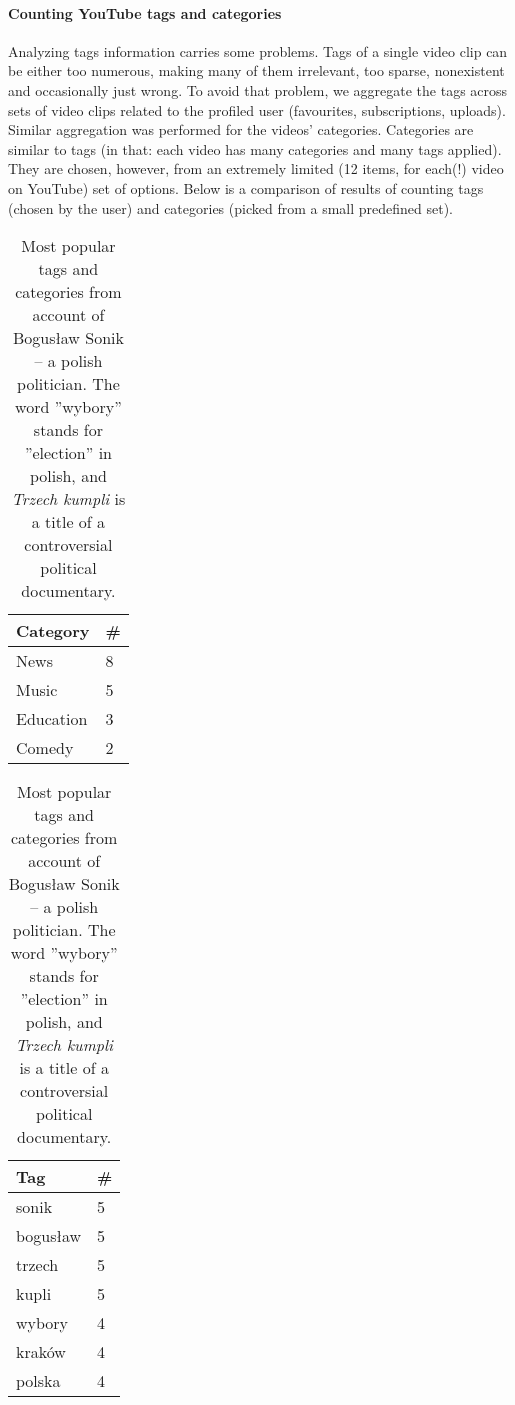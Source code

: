 \paragraph{Counting YouTube tags and categories}
Analyzing tags information carries some problems. Tags of a single video clip
can be either too numerous, making many
of them irrelevant, too sparse, nonexistent and occasionally just wrong. To avoid
that problem, we aggregate the tags across sets of video clips related to the
profiled user (favourites, subscriptions, uploads). Similar aggregation was
performed for the videos' categories. Categories are similar to tags (in that:
each video has many categories and many tags applied). They are chosen,
however, from an extremely limited (12 items, for each(!) video on YouTube) set
of options.  Below is a comparison of results of counting
tags (chosen by the user) and categories (picked from a small predefined set).


\begin{table}[ht]
\begin{minipage}[b]{0.5\linewidth}\centering

\begin{tabular}{| l | l |}
Category & \# \\ \hline
News & 8 \\
Music & 5 \\
Education & 3 \\
Comedy & 2 \\
\end{tabular}

\end{minipage}
\hspace{0.5cm}
\begin{minipage}[b]{0.5\linewidth}
\centering

\begin{tabular}{| l | l |}
Tag & \# \\ \hline
sonik & 5 \\
bogusław & 5 \\
trzech & 5 \\
kupli & 5 \\
wybory & 4 \\
kraków & 4 \\
polska & 4 \\
\end{tabular}

\end{minipage}

\caption{Most popular tags and categories from account of Bogusław Sonik -- a
polish politician. The word ''wybory'' stands for ''election'' in polish, and
\emph{Trzech kumpli} is a title of a controversial political documentary.}
\end{table}


